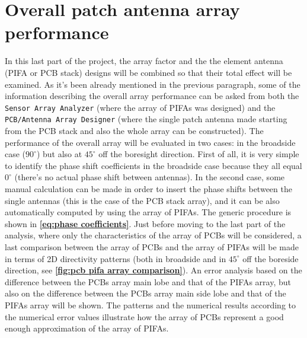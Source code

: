 \documentclass[12pt,a4paper,twocolumn]{article}
\begin{document}
{\section*{\selectfont\color{Turquoise}Overall patch antenna array performance}
In this last part of the project, the array factor and the the element antenna (PIFA or PCB stack) designs will be combined so that their total effect will be examined. As it's been already mentioned in the previous paragraph, some of the information describing the overall array performance can be asked from both the \texttt{\color{Mahogany}Sensor Array Analyzer} (where the array of PIFAs was designed) and the \texttt{\color{Mahogany}PCB/Antenna Array Designer} (where the single patch antenna made starting from the PCB stack and also the whole array can be constructed). The performance of the overall array will be evaluated in two cases: in the broadside case ($90^\circ$) but also at $45^\circ$ off the boresight direction. First of all, it is very simple to identify the phase shift coefficients in the broadside case because they all equal $0^\circ$ (there's no actual phase shift between antennas). In the second case, some manual calculation can be made in order to insert the phase shifts between the single antennas (this is the case of the PCB stack array), and it can be also automatically computed by using the array of PIFAs. The generic procedure is shown in \textbf{\cref{eq:phase coefficients}}. Just before moving to the last part of the analysis, where only the characteristics of the array of PCBs will be considered, a last comparison between the array of PCBs and the array of PIFAs will be made in terms of 2D directivity patterns (both in broadside and in $45^\circ$ off the boreside direction, see \textbf{\cref{fig:pcb pifa array comparison}}). An error analysis based on the difference between the PCBs array main lobe and that of the PIFAs array, but also on the difference between the PCBs array main side lobe and that of the PIFAs array will be shown. The patterns and the numerical results according to the numerical error values illustrate how the array of PCBs represent a good enough approximation of the array of PIFAs. 
}
\end{document}
